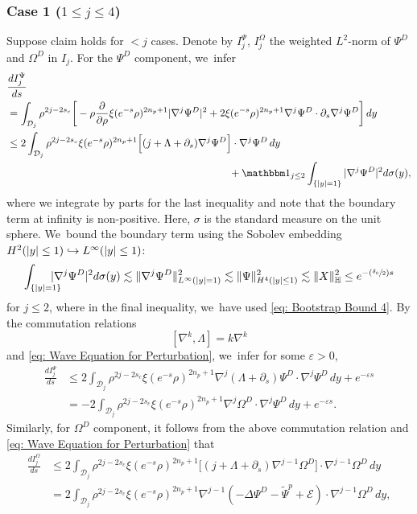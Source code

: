 \documentclass[10pt]{amsart}
\newcommand\hto{\mathrel{\lhook\joinrel\to}}
\newcommand{\Psfrac}[2]{(\sfrac{#1}{#2})}
\theoremstyle{plain}
\theoremstyle{definition}
\begin{document}
\subsubsection*{Case 1 ($1\le j\le 4$)}
Suppose claim holds for $< j$ cases. Denote by $I_j^\Psi$, $I_j^\Omega$ the weighted $L^2$-norm of $\Psi^D$ and $\Omega^D$ in $I_j$. For the $\Psi^D$ component, we~infer
\[
\begin{aligned}
&\frac{dI_j^\Psi}{ds}\\
&=\int_{\mathcal D_j}\rho^{2j-2s_c}\bigg[-\rho\frac{\partial}{\partial \rho}\xi(e^{-s}\rho)^{2n_p+1}|\nabla^j\Psi^D|^2+2\xi(e^{-s}\rho)^{2n_p+1}\nabla^j\Psi^D\cdot\partial_s\nabla^j\Psi^D\bigg]\,dy\\
&\le 2\int_{\mathcal D_j} \rho^{2j-2s_c}\xi(e^{-s}\rho)^{2n_p+1}\Big[(j+\Lambda+\partial_s)\nabla^j\Psi^D\Big]\cdot\nabla^j\Psi^D\,dy\\
&\hspace*{7.5cm}+\mathbbm 1_{j\le 2}\int_{\{|y|=1\}}|\nabla^j\Psi^D|^2d\sigma(y),
\end{aligned}
\]
where we integrate by parts for the last inequality and note that the boundary term at infinity is non-positive. Here, $\sigma$ is the standard measure on the unit sphere. We~bound the boundary term using the Sobolev embedding $H^2(|y|\le 1)\hto L^\infty(|y|\le 1)$:
\begin{equation}
\label{eq: Sobolev rho=1}
\int_{\{|y|=1\}}\hspace*{-4mm}|\nabla^j\Psi^D|^2d\sigma(y)\lesssim \Vert\nabla^j\Psi^D\Vert_{L^\infty(|y|=1)} ^2 \lesssim \Vert\Psi\Vert_{H^4(|y|\le 1)}^2\lesssim \Vert X\Vert_{\mathbb H}^2\le e^{-\Psfrac{\delta_0}{2}s}
\end{equation}
for $j\le 2$, where in the final inequality, we~have used \eqref{eq: Bootstrap Bound 4}. By the commutation relations
\[
[\nabla^k,\Lambda]=k\nabla^k
\]
and \eqref{eq: Wave Equation for Perturbation}, we~infer for some $\varepsilon>0$,
\[
\begin{aligned}
\frac{dI_j^\Psi}{ds} &\le 2\int_{\mathcal D_j}\rho^{2j-2s_c}\xi(e^{-s}\rho)^{2n_p+1}\nabla^j(\Lambda+\partial_s)\Psi^D\cdot\nabla^j\Psi^D\,dy+e^{-\varepsilon s}\\
&=-2\int_{\mathcal D_j} \rho^{2j-2s_c}\xi(e^{-s}\rho)^{2n_p+1}\nabla^j\Omega^D\cdot\nabla^j\Psi^D\,dy+e^{-\varepsilon s}.
\end{aligned}
\]
Similarly, for $\Omega^D$ component, it follows from the above commutation relation and \eqref{eq: Wave Equation for Perturbation} that
\begin{equation}
\label{eq: Omega Energy}
\begin{aligned}
\frac{dI_j^\Omega}{ds} &\le 2\int_{\mathcal D_j}\rho^{2j-2s_c}\xi(e^{-s}\rho)^{2n_p+1}\Big[(j+\Lambda+\partial_s)\nabla^{j-1}\Omega^D\Big]\cdot\nabla^{j-1}\Omega^D\,dy\\
&=2\int_{\mathcal D_j} \rho^{2j-2s_c}\xi(e^{-s}\rho)^{2n_p+1}\nabla^{j-1}(-\Delta \Psi^D -\tilde \Psi^p+\mathcal E)\cdot\nabla^{j-1}\Omega^D\,dy,
\end{aligned}
\end{equation}
\end{document}
